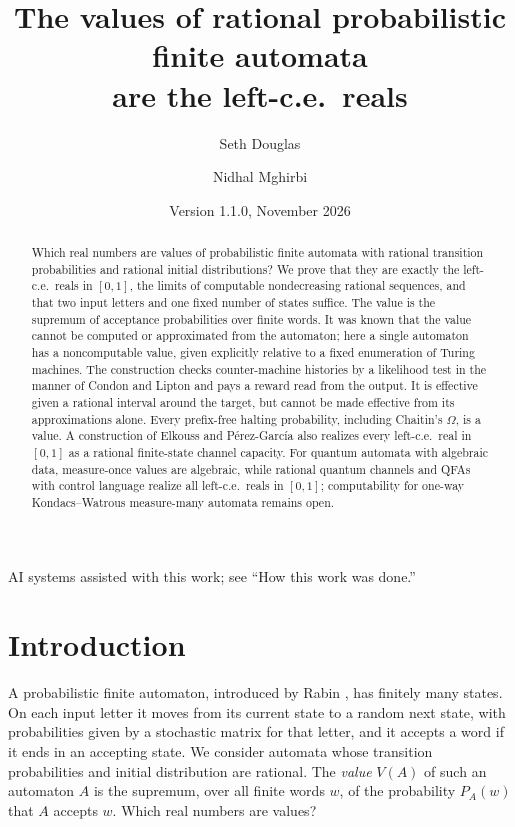 \documentclass[11pt]{article}
\title{\vspace{-1.2cm}\LARGE The values of rational probabilistic finite automata\\ are the left-c.e.\ reals}
\author{Seth Douglas \and Nidhal Mghirbi}
\date{\small Version 1.1.0, November 2026}
\theoremstyle{plain}
\theoremstyle{definition}
\theoremstyle{remark}
\begin{document}
\maketitle
\begin{abstract}
\noindent
Which real numbers are values of probabilistic finite automata with rational transition probabilities and rational initial distributions? We prove that they are exactly the left-c.e.\ reals in $[0,1]$, the limits of computable nondecreasing rational sequences, and that two input letters and one fixed number of states suffice. The value is the supremum of acceptance probabilities over finite words. It was known that the value cannot be computed or approximated from the automaton; here a single automaton has a noncomputable value, given explicitly relative to a fixed enumeration of Turing machines. The construction checks counter-machine histories by a likelihood test in the manner of Condon and Lipton and pays a reward read from the output. It is effective given a rational interval around the target, but cannot be made effective from its approximations alone. Every prefix-free halting probability, including Chaitin's $\Omega$, is a value. A construction of Elkouss and P\'erez-Garc\'ia also realizes every left-c.e.\ real in $[0,1]$ as a rational finite-state channel capacity. For quantum automata with algebraic data, measure-once values are algebraic, while rational quantum channels and QFAs with control language realize all left-c.e.\ reals in $[0,1]$; computability for one-way Kondacs--Watrous measure-many automata remains open.
\end{abstract}
\begin{center}\small AI systems assisted with this work; see ``How this work was done.''\end{center}
{\small\tableofcontents}

\section{Introduction}\label{sec:intro}

A probabilistic finite automaton, introduced by Rabin \cite{Rab63}, has finitely many states. On each input letter it moves from its current state to a random next state, with probabilities given by a stochastic matrix for that letter, and it accepts a word if it ends in an accepting state. We consider automata whose transition probabilities and initial distribution are rational. The \emph{value} $V(A)$ of such an automaton $A$ is the supremum, over all finite words $w$, of the probability $P_A(w)$ that $A$ accepts $w$. Which real numbers are values?
\end{document}
